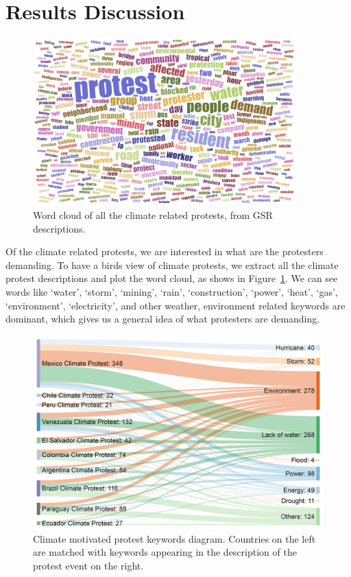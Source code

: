 \section{Results Discussion}

\begin{figure}[ht]
\centerline
{\includegraphics[width=4in]{figures/Climate_word_cloud.png}}
\caption{Word cloud of all the climate related protests, from GSR descriptions.}
\label{wordcloud}
\end{figure}

Of the climate related protests, we are interested in what are the protesters demanding. To have a birds view of climate protests, we extract all the climate protest descriptions and plot the word cloud, as shows in Figure~\ref{wordcloud}. We can see words like `water', `storm', `mining', `rain', `construction', `power', `heat', `gas', `environment', `electricity', and other weather, environment related keywords are dominant, which gives us a general idea of what protesters are demanding.

\begin{figure}[t]
\centerline
{\includegraphics[width=4.5in]{figures/causality1.png}}
\caption{Climate motivated protest keywords diagram. Countries on the left are matched with keywords appearing in the description of the protest event on the right.}
\label{causality}
\end{figure}

